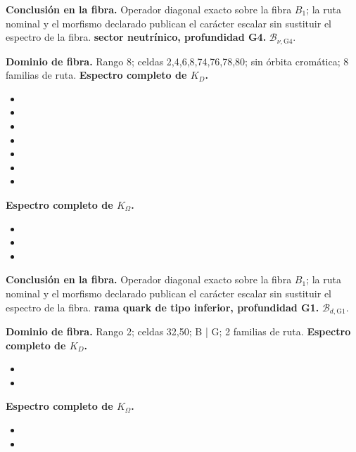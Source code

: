 \noindent\textbf{Conclusión en la fibra.} Operador diagonal exacto sobre la fibra \(B_1\); la ruta nominal y el morfismo declarado publican el carácter escalar sin sustituir el espectro de la fibra.
\medskip
{}
\noindent\textbf{sector neutrínico, profundidad G4.} \(\mathcal B_{\nu,\mathrm{G4}}\).\par
\noindent\textbf{Dominio de fibra.} Rango 8; celdas 2,4,6,8,74,76,78,80; sin órbita cromática; 8 familias de ruta.
\noindent\textbf{Espectro completo de \(K_D\).}
\begin{itemize}
\item \texttt{}
\item \texttt{}
\item \texttt{}
\item \texttt{}
\item \texttt{}
\item \texttt{}
\item \texttt{}
\end{itemize}
\noindent\textbf{Espectro completo de \(K_\Omega\).}
\begin{itemize}
\item \texttt{}
\item \texttt{}
\item \texttt{}
\end{itemize}
\noindent\textbf{Conclusión en la fibra.} Operador diagonal exacto sobre la fibra \(B_1\); la ruta nominal y el morfismo declarado publican el carácter escalar sin sustituir el espectro de la fibra.
\medskip
{}
\noindent\textbf{rama quark de tipo inferior, profundidad G1.} \(\mathcal B_{d,\mathrm{G1}}\).\par
\noindent\textbf{Dominio de fibra.} Rango 2; celdas 32,50; B | G; 2 familias de ruta.
\noindent\textbf{Espectro completo de \(K_D\).}
\begin{itemize}
\item \texttt{}
\item \texttt{}
\end{itemize}
\noindent\textbf{Espectro completo de \(K_\Omega\).}
\begin{itemize}
\item \texttt{}
\item \texttt{}
\end{itemize}

